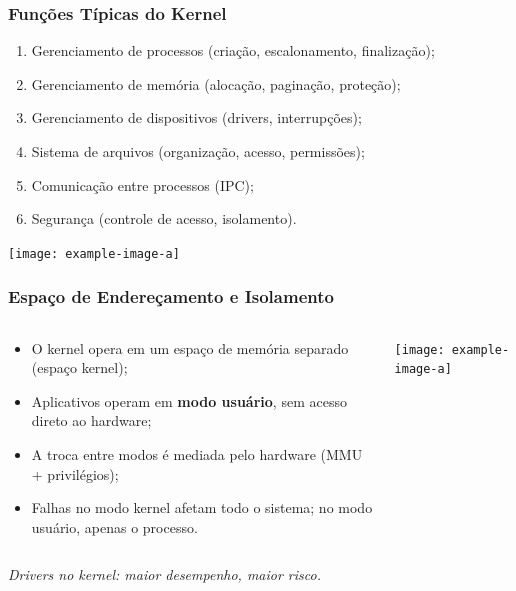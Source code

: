 \documentclass{beamer}
\begin{document}
\begin{frame}[fragile]
    \frametitle{Fun\c{c}\~oes T\'ipicas do Kernel}

    \begin{enumerate}\small
        \item Gerenciamento de processos (cria\c{c}\~ao, escalonamento, finaliza\c{c}\~ao);
        \item Gerenciamento de mem\'{o}ria (aloca\c{c}\~ao, pagina\c{c}\~ao, prote\c{c}\~ao);
        \item Gerenciamento de dispositivos (drivers, interrup\c{c}\~oes);
        \item Sistema de arquivos (organiza\c{c}\~ao, acesso, permiss\~oes);
        \item Comunica\c{c}\~ao entre processos (IPC);
        \item Seguran\c{c}a (controle de acesso, isolamento).
    \end{enumerate}

    \vfill
    \begin{center}
        \texttt{[image: example-image-a]} %
    \end{center}
\end{frame}

\begin{frame}[fragile]
    \frametitle{Espa\c{c}o de Endere\c{c}amento e Isolamento}

    \begin{columns}
        \begin{column}{0.55\textwidth}
            \begin{itemize}\small
                \item O kernel opera em um espa\c{c}o de mem\'{o}ria separado (espa\c{c}o kernel);
                \item Aplicativos operam em \textbf{modo usu\'{a}rio}, sem acesso direto ao hardware;
                \item A troca entre modos \'{e} mediada pelo hardware (MMU + privil\'{e}gios);
                \item Falhas no modo kernel afetam todo o sistema; no modo usu\'{a}rio, apenas o processo.
            \end{itemize}
        \end{column}
        \begin{column}{0.45\textwidth}
            \begin{center}
                \texttt{[image: example-image-a]} %
            \end{center}
        \end{column}
    \end{columns}

    \vfill
    \begin{center}
        \textit{Drivers no kernel: maior desempenho, maior risco.}
    \end{center}
\end{frame}
\end{document}
